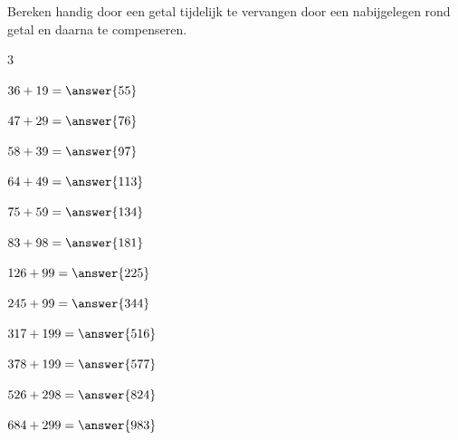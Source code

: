 \documentclass{ximera}
\begin{document}
\begin{oefening}{\oefB\ESS}

    Bereken handig door een getal tijdelijk te vervangen door een nabijgelegen
    rond getal en daarna te compenseren.
    
    \begin{multicols}{3}
    
    \begin{question} \(36+19=\answer{55}\) \end{question}
    
    \begin{question} \(47+29=\answer{76}\) \end{question}
    
    \begin{question} \(58+39=\answer{97}\) \end{question}
    
    \begin{question} \(64+49=\answer{113}\) \end{question}
    
    \begin{question} \(75+59=\answer{134}\) \end{question}
    
    \begin{question} \(83+98=\answer{181}\) \end{question}
    
    \begin{question} \(126+99=\answer{225}\) \end{question}
    
    \begin{question} \(245+99=\answer{344}\) \end{question}
    
    \begin{question} \(317+199=\answer{516}\) \end{question}
    
    \begin{question} \(378+199=\answer{577}\) \end{question}
    
    \begin{question} \(526+298=\answer{824}\) \end{question}
    
    \begin{question} \(684+299=\answer{983}\) \end{question}
    

\end{multicols}
\end{oefening}
\end{document}
